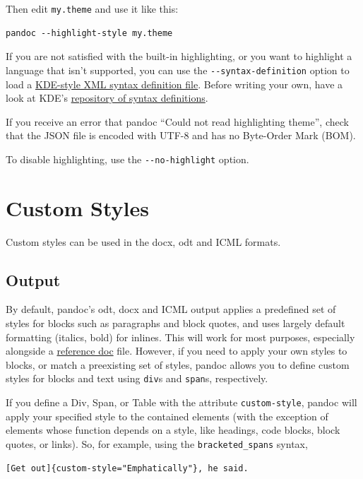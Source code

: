 \documentclass[
  b5paper
]{book}
\begin{document}
Then edit \texttt{my.theme} and use it like this:

\begin{verbatim}
pandoc --highlight-style my.theme
\end{verbatim}

If you are not satisfied with the built-in highlighting, or you want to
highlight a language that isn't supported, you can use the
\texttt{-\/-syntax-definition} option to load a
\href{https://docs.kde.org/stable5/en/kate/katepart/highlight.html}{KDE-style
XML syntax definition file}. Before writing your own, have a look at
KDE's
\href{https://github.com/KDE/syntax-highlighting/tree/master/data/syntax}{repository
of syntax definitions}.

If you receive an error that pandoc ``Could not read highlighting
theme'', check that the JSON file is encoded with UTF-8 and has no
Byte-Order Mark (BOM).

To disable highlighting, use the \texttt{-\/-no-highlight} option.

\chapter{Custom Styles}\label{custom-styles}

Custom styles can be used in the docx, odt and ICML formats.

\section{Output}\label{output}

By default, pandoc's odt, docx and ICML output applies a predefined set
of styles for blocks such as paragraphs and block quotes, and uses
largely default formatting (italics, bold) for inlines. This will work
for most purposes, especially alongside a
\hyperref[option--reference-doc]{reference doc} file. However, if you
need to apply your own styles to blocks, or match a preexisting set of
styles, pandoc allows you to define custom styles for blocks and text
using \texttt{div}s and \texttt{span}s, respectively.

If you define a Div, Span, or Table with the attribute
\texttt{custom-style}, pandoc will apply your specified style to the
contained elements (with the exception of elements whose function
depends on a style, like headings, code blocks, block quotes, or links).
So, for example, using the \texttt{bracketed\_spans} syntax,

\begin{verbatim}
[Get out]{custom-style="Emphatically"}, he said.
\end{verbatim}
\end{document}
